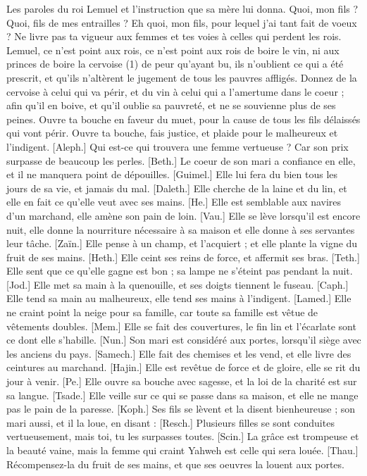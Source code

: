 \begin{multicols}{2}
\VerseOne{}Les paroles du roi Lemuel et l'instruction que sa mère lui donna.
Quoi, mon fils ? Quoi, fils de mes entrailles ? Eh quoi, mon fils, pour lequel j'ai tant fait de voeux ?
Ne livre pas ta vigueur aux femmes et tes voies à celles qui perdent les rois.
Lemuel, ce n'est point aux rois, ce n'est point aux rois de boire le vin, ni aux princes de boire la cervoise (1)
de peur qu'ayant bu, ils n'oublient ce qui a été prescrit, et qu'ils n'altèrent le jugement de tous les pauvres affligés.
Donnez de la cervoise à celui qui va périr, et du vin à celui qui a l'amertume dans le coeur ;
afin qu'il en boive, et qu'il oublie sa pauvreté, et ne se souvienne plus de ses peines.
Ouvre ta bouche en faveur du muet, pour la cause de tous les fils délaissés qui vont périr.
Ouvre ta bouche, fais justice, et plaide pour le malheureux et l’indigent.
[Aleph.] Qui est-ce qui trouvera une femme vertueuse ? Car son prix surpasse de beaucoup les perles.
[Beth.] Le coeur de son mari a confiance en elle, et il ne manquera point de dépouilles.
[Guimel.] Elle lui fera du bien tous les jours de sa vie, et jamais du mal.
[Daleth.] Elle cherche de la laine et du lin, et elle en fait ce qu'elle veut avec ses mains.
[He.] Elle est semblable aux navires d'un marchand, elle amène son pain de loin.
[Vau.] Elle se lève lorsqu'il est encore nuit, elle donne la nourriture nécessaire à sa maison et elle donne à ses servantes leur tâche.
[Zaïn.] Elle pense à un champ, et l'acquiert ; et elle plante la vigne du fruit de ses mains.
[Heth.] Elle ceint ses reins de force, et affermit ses bras.
[Teth.] Elle sent que ce qu’elle gagne est bon ; sa lampe ne s'éteint pas pendant la nuit.
[Jod.] Elle met sa main à la quenouille, et ses doigts tiennent le fuseau.
[Caph.] Elle tend sa main au malheureux, elle tend ses mains à l’indigent.
[Lamed.] Elle ne craint point la neige pour sa famille, car toute sa famille est vêtue de vêtements doubles.
[Mem.] Elle se fait des couvertures, le fin lin et l'écarlate sont ce dont elle s'habille.
[Nun.] Son mari est considéré aux portes, lorsqu’il siège avec les anciens du pays.
[Samech.] Elle fait des chemises et les vend, et elle livre des ceintures au marchand.
[Hajin.] Elle est revêtue de force et de gloire, elle se rit du jour à venir.
[Pe.] Elle ouvre sa bouche avec sagesse, et la loi de la charité est sur sa langue.
[Tsade.] Elle veille sur ce qui se passe dans sa maison, et elle ne mange pas le pain de la paresse.
[Koph.] Ses fils se lèvent et la disent bienheureuse ; son mari aussi, et il la loue, en disant :
[Resch.] Plusieurs filles se sont conduites vertueusement, mais toi, tu les surpasses toutes.
[Scin.] La grâce est trompeuse et la beauté vaine, mais la femme qui craint Yahweh est celle qui sera louée.
[Thau.] Récompensez-la du fruit de ses mains, et que ses oeuvres la louent aux portes.
\PPE{}
\end{multicols}
